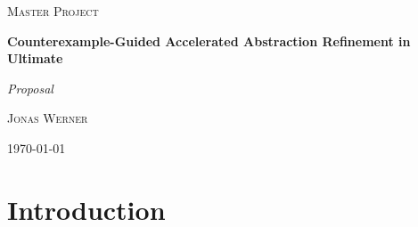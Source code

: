 \documentclass{article}
\begin{document}
	\newcommand{\HorizontalLine}{\rule{\linewidth}{0.3mm}}
	
		\begin{center}
		{\scshape\Large Master Project \par}
		\vspace{1.5cm}
		{\huge\bfseries Counterexample-Guided Accelerated Abstraction Refinement in Ultimate \par}
		{\Huge\itshape Proposal \par}
		\vspace{1cm}
		{\large \scshape Jonas Werner\par}
		\vspace{0.5cm}
		{\today \vspace{2cm}} 
		
		\end{center}

\pagebreak
\section{Introduction}

	



	
\end{document}
